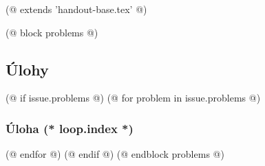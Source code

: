 (@ extends 'handout-base.tex' @)

(@ block problems @)
    \subsection{Úlohy}
    (@ if issue.problems @)
        (@ for problem in issue.problems @)
            \subsubsection{Úloha (* loop.index *)}
        (@ endfor @)
    (@ endif @)
(@ endblock problems @)
